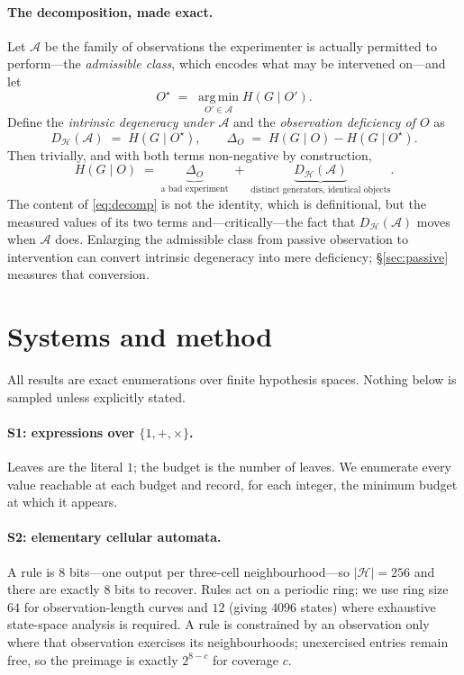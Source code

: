 \documentclass[11pt]{article}
\newcommand{\HH}{\ensuremath{\mathcal{H}}}
\begin{document}
\paragraph{The decomposition, made exact.}
Let $\mathcal{A}$ be the family of observations the experimenter is actually permitted
to perform---the \emph{admissible class}, which encodes what may be intervened on---and
let
\[
  O^\star \;=\; \operatorname*{arg\,min}_{O' \in \mathcal{A}} H(G \mid O') .
\]
Define the \emph{intrinsic degeneracy under $\mathcal{A}$} and the
\emph{observation deficiency of $O$} as
\[
  D_\HH(\mathcal{A}) \;=\; H(G \mid O^\star),
  \qquad
  \Delta_O \;=\; H(G \mid O) - H(G \mid O^\star) .
\]
Then trivially, and with both terms non-negative by construction,
\begin{equation}\label{eq:decomp}
  H(G \mid O) \;=\; \underbrace{\Delta_O}_{\text{a bad experiment}}
  \;+\; \underbrace{D_\HH(\mathcal{A})}_{\text{distinct generators, identical objects}} .
\end{equation}
The content of \eqref{eq:decomp} is not the identity, which is definitional, but the
measured values of its two terms and---critically---the fact that
$D_\HH(\mathcal{A})$ moves when $\mathcal{A}$ does. Enlarging the admissible class from
passive observation to intervention can convert intrinsic degeneracy into mere
deficiency; \S\ref{sec:passive} measures that conversion.

\section{Systems and method}\label{sec:systems}

All results are exact enumerations over finite hypothesis spaces. Nothing below is
sampled unless explicitly stated.

\paragraph{S1: expressions over $\{1,+,\times\}$.}
Leaves are the literal $1$; the budget is the number of leaves. We enumerate every
value reachable at each budget and record, for each integer, the minimum budget at
which it appears.

\paragraph{S2: elementary cellular automata.}
A rule is $8$ bits---one output per three-cell neighbourhood---so $|\HH|=256$ and there
are exactly $8$ bits to recover. Rules act on a periodic ring; we use ring size $64$ for
observation-length curves and $12$ (giving $4096$ states) where exhaustive state-space
analysis is required. A rule is constrained by an observation only where that
observation exercises its neighbourhoods; unexercised entries remain free, so the
preimage is exactly $2^{8-c}$ for coverage $c$.
\end{document}
